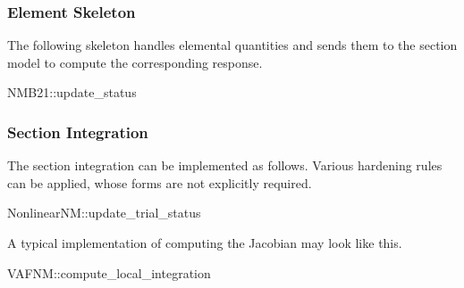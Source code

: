 \subsubsection{Element Skeleton}
The following skeleton handles elemental quantities and sends them to the section model to compute the corresponding response.
\begin{cppcode}
NMB21::update_status
\end{cppcode}
\subsubsection{Section Integration}
The section integration can be implemented as follows.
Various hardening rules can be applied, whose forms are not explicitly required.
\begin{cppcode}
NonlinearNM::update_trial_status
\end{cppcode}

A typical implementation of computing the Jacobian may look like this.
\begin{cppcode}
VAFNM::compute_local_integration
\end{cppcode}